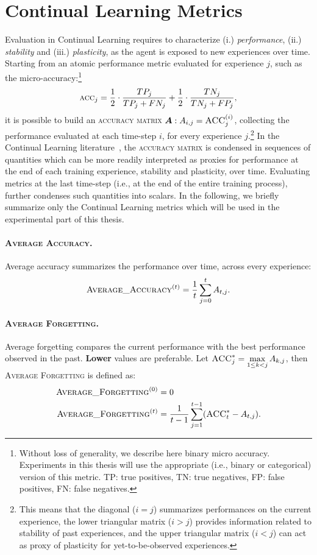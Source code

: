 \section{Continual Learning Metrics}
Evaluation in Continual Learning requires to characterize (i.) \textit{performance}, (ii.) \textit{stability} and (iii.) \textit{plasticity}, as the agent is exposed to new experiences over time.
Starting from an atomic performance metric evaluated for experience $j$, such as the micro-accuracy:\footnote{Without loss of generality, we describe here binary micro accuracy. Experiments in this thesis will use the appropriate (i.e., binary or categorical) version of this metric. TP: true positives, TN: true negatives, FP: false positives, FN: false negatives.}
\begin{equation*}
	\textsc{acc}_j = \frac{1}{2}\cdot \frac{TP_j}{TP_j + FN_j} + \frac{1}{2}\cdot \frac{TN_j}{TN_j + FP_j},
\end{equation*}
it is possible to build an \textsc{accuracy matrix} ${\bm{A}}: {A}_{i,j} = \textsc{ACC}^{(i)}_j$, collecting the performance evaluated at each time-step $i$, for every experience $j$.\footnote{This means that the diagonal ($i = j$) summarizes performances on the current experience, the lower triangular matrix ($i > j$) provides information related to stability of past experiences, and the upper triangular matrix ($i < j$) can act as proxy of plasticity for yet-to-be-observed experiences.}
In the Continual Learning literature~\cite{wang2023comprehensive,mai2022online}, the \textsc{accuracy matrix} is condensed in sequences of quantities which can be more readily interpreted as proxies for performance at the end of each training experience, stability and plasticity, over time. Evaluating metrics at the last time-step (i.e., at the end of the entire training process), further condenses such quantities into scalars.
In the following, we briefly summarize only the Continual Learning metrics which will be used in the experimental part of this thesis.
\paragraph{\textsc{Average Accuracy}.} Average accuracy summarizes the performance over time, across every experience:
\begin{equation*}
	\textsc{Average\_Accuracy}^{(t)} = \frac{1}{t} \sum_{j=0}^t {A}_{t,j}.
\end{equation*}

\paragraph{\textsc{Average Forgetting}.} Average forgetting compares the current performance with the best performance observed in the past. \textbf{Lower} values are preferable. Let $\textsc{ACC}^*_j = \displaystyle\max_{1 \leq k < j} {A}_{k,j}$, then \textsc{Average Forgetting} is defined as:
\begin{align*}
	\textsc{Average\_Forgetting}^{(0)} &= 0\\
	\textsc{Average\_Forgetting}^{(t)} &= \frac{1}{t - 1} \sum_{j=1}^{t-1} (\textsc{ACC}^*_t - {A}_{t,j}).
\end{align*}

